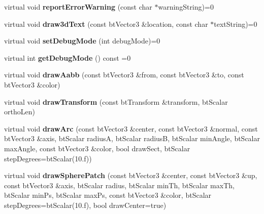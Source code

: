 \begin{DoxyCompactItemize}
\mbox{\label{classbtIDebugDraw_a4114a426d9d922d7b834673bb4044757}} 
virtual void {\bfseries report\+Error\+Warning} (const char $\ast$warning\+String)=0
\item 
\mbox{\label{classbtIDebugDraw_a287102dad359ae7c0685ec527c54ea48}} 
virtual void {\bfseries draw3d\+Text} (const bt\+Vector3 \&location, const char $\ast$text\+String)=0
\item 
\mbox{\label{classbtIDebugDraw_a682fb01e96403d1da04207b7a9b46639}} 
virtual void {\bfseries set\+Debug\+Mode} (int debug\+Mode)=0
\item 
\mbox{\label{classbtIDebugDraw_a8b0e36c47552ec81ea61a16f6239f92d}} 
virtual int {\bfseries get\+Debug\+Mode} () const =0
\item 
\mbox{\label{classbtIDebugDraw_ae60d3fc7f75c75712261d970dbd87fb9}} 
virtual void {\bfseries draw\+Aabb} (const bt\+Vector3 \&from, const bt\+Vector3 \&to, const bt\+Vector3 \&color)
\item 
\mbox{\label{classbtIDebugDraw_a6faa8214eebc450104325b6833448b1e}} 
virtual void {\bfseries draw\+Transform} (const bt\+Transform \&transform, bt\+Scalar ortho\+Len)
\item 
\mbox{\label{classbtIDebugDraw_a19cd036ce23c673c4ac13cc3f2a5ac33}} 
virtual void {\bfseries draw\+Arc} (const bt\+Vector3 \&center, const bt\+Vector3 \&normal, const bt\+Vector3 \&axis, bt\+Scalar radiusA, bt\+Scalar radiusB, bt\+Scalar min\+Angle, bt\+Scalar max\+Angle, const bt\+Vector3 \&color, bool draw\+Sect, bt\+Scalar step\+Degrees=bt\+Scalar(10.f))
\item 
\mbox{\label{classbtIDebugDraw_aaa3510d1efce41e4a98915ef542c4288}} 
virtual void {\bfseries draw\+Sphere\+Patch} (const bt\+Vector3 \&center, const bt\+Vector3 \&up, const bt\+Vector3 \&axis, bt\+Scalar radius, bt\+Scalar min\+Th, bt\+Scalar max\+Th, bt\+Scalar min\+Ps, bt\+Scalar max\+Ps, const bt\+Vector3 \&color, bt\+Scalar step\+Degrees=bt\+Scalar(10.f), bool draw\+Center=true)
\item 
\mbox{\label{classbtIDebugDraw_a9c9e46fa03d6296f8b3f57538db6be7f}} 

\end{DoxyCompactItemize}
